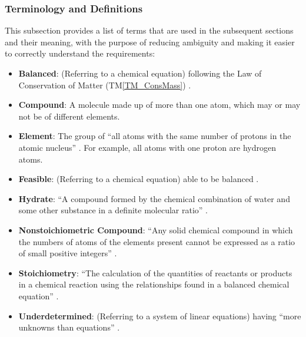 \documentclass[12pt]{article}
\newcommand{\tmref}[1]{TM\ref{#1}}
\begin{document}
\subsubsection{Terminology and  Definitions} \label{sec_termsDefs}
This subsection provides a list of terms that are used in the subsequent
sections and their meaning, with the purpose of reducing ambiguity and making it
easier to correctly understand the requirements:

\begin{itemize}
  \item \textbf{Balanced}: (Referring to a chemical equation) following the Law
        of Conservation of Matter (\tmref{TM_ConsMass})
        \cite{lund_introduction_2023}.

  \item \textbf{Compound}: A molecule made up of more than one atom, which may
        or may not be of different elements.

  \item \textbf{Element}: The group of ``all atoms with the same number of
        protons in the atomic nucleus'' \cite{hartshorn_brief_2015}. For
        example, all atoms with one proton are hydrogen atoms.

  \item \textbf{Feasible}: (Referring to a chemical equation) able to be
        balanced \cite{hamid_balancing_2019}.

  \item \textbf{Hydrate}: ``A compound formed by the chemical combination of water
        and some other substance in a definite molecular ratio''
        \cite{harpercollins_publishers_hydrate_nodate}.

  \item \textbf{Nonstoichiometric Compound}: ``Any solid chemical compound in
        which the numbers of atoms of the elements present cannot be expressed as a
        ratio of small positive integers''
        \cite{the_editors_of_encyclopaedia_britannica_nonstoichiometric_2010}.


  \item \textbf{Stoichiometry}: ``The calculation of the quantities of reactants
        or products in a chemical reaction using the relationships found in a balanced
        chemical equation'' \cite[p. 337]{lund_introduction_2023}.

  \item \textbf{Underdetermined}: (Referring to a system of linear equations)
        having ``more unknowns than equations'' \cite{colbry_matrix_2023}.
\end{itemize}
\end{document}
